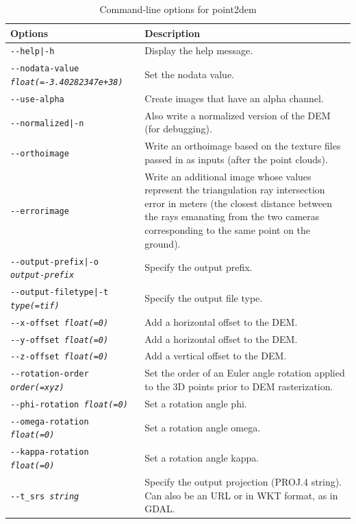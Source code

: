 \begin{longtable}{|p{8cm}|p{9cm}|}
\caption{Command-line options for point2dem}
\label{tbl:point2dem}
\endfirsthead
\endhead
\endfoot
\endlastfoot
\hline
Options & Description \\ \hline \hline
\texttt{-\/-help|-h} & Display the help message. \\ \hline
\texttt{-\/-nodata-value \textit{float(=-3.40282347e+38)}} & Set the nodata value. \\ \hline
\texttt{-\/-use-alpha} & Create images that have an alpha channel. \\ \hline
\texttt{-\/-normalized|-n} & Also write a normalized version of the \ac{DEM} (for debugging). \\ \hline
\texttt{-\/-orthoimage} & Write an orthoimage based on the texture files passed in as inputs (after the point clouds). \\ \hline
\texttt{-\/-errorimage} & Write an additional image whose values represent the triangulation ray intersection error in meters (the closest distance between the rays emanating from the two cameras corresponding to the same point on the ground). \\ \hline
\texttt{-\/-output-prefix|-o \textit{output-prefix}} & Specify the output prefix. \\ \hline
\texttt{-\/-output-filetype|-t \textit{type(=tif)}} & Specify the output file type. \\ \hline
\hline
\texttt{-\/-x-offset \textit{float(=0)}} & Add a horizontal offset to the \ac{DEM}. \\ \hline
\texttt{-\/-y-offset \textit{float(=0)}} & Add a horizontal offset to the \ac{DEM}. \\ \hline
\texttt{-\/-z-offset \textit{float(=0)}} & Add a vertical offset to the \ac{DEM}. \\ \hline
\texttt{-\/-rotation-order \textit{order(=xyz)}} & Set the order of an Euler angle rotation applied to the 3D points prior to \ac{DEM} rasterization. \\ \hline
\texttt{-\/-phi-rotation \textit{float(=0)}} & Set a rotation angle phi. \\ \hline
\texttt{-\/-omega-rotation \textit{float(=0)}} & Set a rotation angle omega. \\ \hline
\texttt{-\/-kappa-rotation \textit{float(=0)}} & Set a rotation angle kappa. \\ \hline
\hline
\texttt{-\/-t\_srs \textit{string}} & Specify the output projection (PROJ.4 string).  Can also be an URL or in WKT format, as in GDAL.\\ \hline

\end{longtable}
